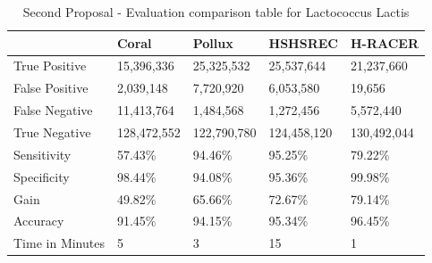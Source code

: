 \documentclass[12pt]{llncs}
\newcommand{\TBstrut}{{\rule{0pt}{7ex}}{\rule[2ex]{0pt}{0pt}}} %
\begin{document}
\newpage
\begin{longtable}{|m{33mm}|m{20mm}|m{20mm}|m{20mm}|m{20mm}|}
	    \caption{\label{tab:eval-1}Second Proposal - Evaluation comparison table for Lactococcus Lactis}\\
        \hline
           & Coral & Pollux & HSHSREC & H-RACER\cellcolor{DarkGray} \TBstrut\\ %
        \hline
           True Positive & 15,396,336 &  25,325,532 & 25,537,644 & 21,237,660\cellcolor{LightGray} \TBstrut\\ %
        \hline
           False Positive & 2,039,148 &  7,720,920 & 6,053,580 & 19,656\cellcolor{LightGray} \TBstrut\\ %
        \hline
           False Negative & 11,413,764 & 1,484,568 & 1,272,456 & 5,572,440\cellcolor{LightGray} \TBstrut\\ %
        \hline
           True Negative & 128,472,552 & 122,790,780 & 124,458,120 & 130,492,044\cellcolor{LightGray} \TBstrut\\ %
        \hline
           Sensitivity & 57.43\% & 94.46\% & 95.25\% & 79.22\%\cellcolor{LightGray} \TBstrut\\ %
        \hline
           Specificity & 98.44\% & 94.08\% & 95.36\% & 99.98\%\cellcolor{LightGray} \TBstrut\\ %
        \hline
           Gain & 49.82\% & 65.66\% & 72.67\% & 79.14\%\cellcolor{LightGray} \TBstrut\\ %
        \hline
           Accuracy & 91.45\% & 94.15\% & 95.34\% & 96.45\%\cellcolor{LightGray} \TBstrut\\ %
        \hline
           Time in Minutes& 5 & 3 & 15 & 1\cellcolor{LightGray} \TBstrut\\ %
        \hline
\end{longtable}
\newpage
\end{document}
